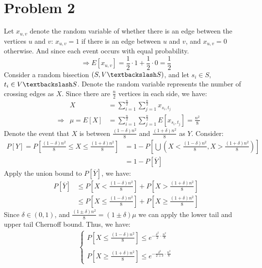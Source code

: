 \documentclass{article}
\begin{document}
\section*{Problem 2}
Let $x_{u, v}$ denote the random variable of whether there is an edge between the vertices $u$ and $v$: $x_{u, v} = 1$ if there is an edge between $u$ and $v$, and $x_{u, v} = 0$ otherwise. And since each event occurs with equal probability.
\[
\Rightarrow E[x_{u,v}] = \frac{1}{2} \cdot 1 + \frac{1}{2} \cdot 0 = \frac{1}{2}
\]
Consider a random bisection $(S, V \textbackslash S)$, and let $s_i \in S$, $t_i \in V \textbackslash S$. Denote the random variable represents the number of crossing edges as $X$. Since there are $\frac{n}{2}$ vertices in each side, we have:
\[
\begin{aligned}
&                  & X &= \sum_{i=1}^{\frac{n}{2}}\sum_{j=1}^{\frac{n}{2}} x_{s_i, t_j} \\
&\Rightarrow& \mu  = E[X] &= \sum_{i=1}^{\frac{n}{2}}\sum_{j=1}^{\frac{n}{2}} E[x_{s_i, t_j}] = \frac{n^2}{8}
\end{aligned}
\] 
Denote the event that $X$ is between $\frac{(1-\delta)n^2}{8}$ and $\frac{(1+\delta)n^2}{8}$ as $Y$. Consider:
\[
\begin{aligned}
P[Y] = P \left[ \frac{(1-\delta)n^2}{8} \leq X \leq  \frac{(1+\delta)n^2}{8} \right] &= 1 - P \left[ \bigcup \left( X < \frac{(1-\delta)n^2}{8}, X > \frac{(1+\delta)n^2}{8} \right) \right] \\
&= 1 - P[\overline{Y}]
\end{aligned}
\]
Apply the union bound to $P[\overline{Y}]$, we have:
\[
\begin{aligned}
P[\overline{Y}] &\leq P \left[ X < \frac{(1-\delta)n^2}{8} \right] + P \left[ X > \frac{(1+\delta)n^2}{8} \right] \\ 
&\leq P \left[ X \leq \frac{(1-\delta)n^2}{8} \right] + P \left[ X \geq \frac{(1+\delta)n^2}{8} \right]
\end{aligned}
\]
Since $\delta \in (0,1)$, and $\frac{(1 \pm \delta)n^2}{8} = (1 \pm \delta)\mu$ we can apply the lower tail and upper tail Chernoff bound. Thus, we have:
\[
\begin{aligned}
\begin{cases}
            P \left[ X \leq \frac{(1-\delta)n^2}{8} \right] \leq e^{-\frac{\delta^2}{2} \cdot \frac{n^2}{8}}  \\\\
            P \left[ X \geq \frac{(1+\delta)n^2}{8} \right] \leq e^{-\frac{\delta^2}{2+\delta} \cdot \frac{n^2}{8}} 
        \end{cases} 
\end{aligned}
\]
\end{document}
